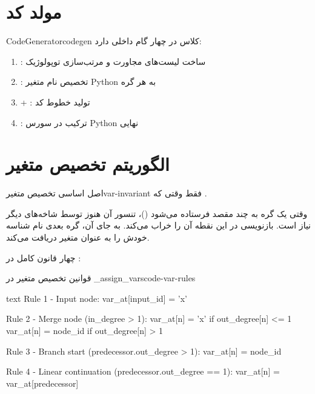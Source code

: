 \documentclass{nngraph-fa}
\begin{document}
\section{مولد کد}

\begin{dfnbox}{CodeGenerator}{codegen}
کلاس  در  چهار گام
داخلی دارد:
\begin{enumerate}[noitemsep]
    \item {}: ساخت لیست‌های مجاورت و مرتب‌سازی
    توپولوژیک
    \item {}: تخصیص نام متغیر Python به هر گره
    \item {} + : تولید خطوط کد
    \item {}: ترکیب در سورس Python نهایی
\end{enumerate}
\end{dfnbox}

\section{الگوریتم تخصیص متغیر}

\begin{dfnbox}{اصل اساسی تخصیص متغیر}{var-invariant}
 فقط وقتی که
.

وقتی یک گره به چند مقصد فرستاده می‌شود ()،
تنسور آن هنوز توسط شاخه‌های دیگر نیاز است. بازنویسی 
در این نقطه آن را خراب می‌کند. به جای آن، گره بعدی نام شناسه
خودش را به عنوان متغیر دریافت می‌کند.
\end{dfnbox}

چهار قانون کامل در :

\begin{codebox}{قوانین تخصیص متغیر در \_assign\_vars}{code-var-rules}
\begin{amzcode}{text}
Rule 1 - Input node:
    var_at[input_id] = 'x'

Rule 2 - Merge node (in_degree > 1):
    var_at[n] = 'x'       if out_degree[n] <= 1
    var_at[n] = node_id   if out_degree[n] > 1

Rule 3 - Branch start (predecessor.out_degree > 1):
    var_at[n] = node_id

Rule 4 - Linear continuation (predecessor.out_degree == 1):
    var_at[n] = var_at[predecessor]
\end{amzcode}
\end{codebox}
\end{document}
